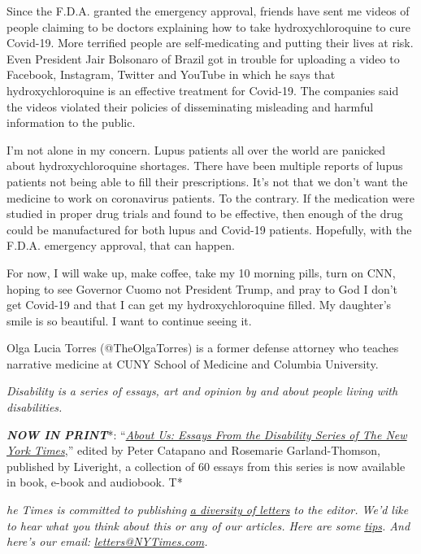 Since the F.D.A. granted the emergency approval, friends have sent me
videos of people claiming to be doctors explaining how to take
hydroxychloroquine to cure Covid-19. More terrified people are
self-medicating and putting their lives at risk. Even President Jair
Bolsonaro of Brazil got in trouble for uploading a video to Facebook,
Instagram, Twitter and YouTube in which he says that hydroxychloroquine
is an effective treatment for Covid-19. The companies said the videos
violated their policies of disseminating misleading and harmful
information to the public.

I'm not alone in my concern. Lupus patients all over the world are
panicked about hydroxychloroquine shortages. There have been multiple
reports of lupus patients not being able to fill their prescriptions.
It's not that we don't want the medicine to work on coronavirus
patients. To the contrary. If the medication were studied in proper drug
trials and found to be effective, then enough of the drug could be
manufactured for both lupus and Covid-19 patients. Hopefully, with the
F.D.A. emergency approval, that can happen.

For now, I will wake up, make coffee, take my 10 morning pills, turn on
CNN, hoping to see Governor Cuomo not President Trump, and pray to God I
don't get Covid-19 and that I can get my hydroxychloroquine filled. My
daughter's smile is so beautiful. I want to continue seeing it.

Olga Lucia Torres (@TheOlgaTorres) is a former defense attorney who
teaches narrative medicine at CUNY School of Medicine and Columbia
University.

\emph{Disability is a series of essays, art and opinion by and about
people living with disabilities.}

\emph{\textbf{NOW IN PRINT}}*:
``\emph{\href{https://www.aboutusbook.com/}{\emph{About Us: Essays From
the Disability Series of The New York Times}}},'' edited by Peter
Catapano and Rosemarie Garland-Thomson, published by Liveright, a
collection of 60 essays from this series is now available in book,
e-book and audiobook. T*

\emph{he Times is committed to publishing}
\href{https://www.nytimes3xbfgragh.onion/2019/01/31/opinion/letters/letters-to-editor-new-york-times-women.html}{\emph{a
diversity of letters}} \emph{to the editor. We'd like to hear what you
think about this or any of our articles. Here are some}
\href{https://help.nytimes3xbfgragh.onion/hc/en-us/articles/115014925288-How-to-submit-a-letter-to-the-editor}{\emph{tips}}\emph{.
And here's our email:}
\href{mailto:letters@NYTimes.com}{\emph{letters@NYTimes.com}}\emph{.}

